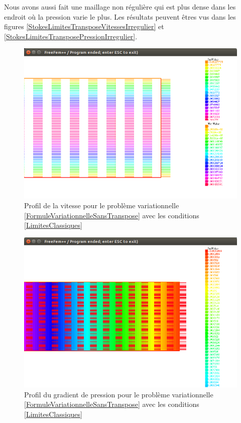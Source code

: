 \documentclass[11pt,a4paper]{article}
\numberwithin{equation}{subsection}
\numberwithin{figure}{subsection}
\begin{document}
Nous avons aussi fait une maillage non régulière qui est plus dense dans les endroit où la pression varie le plus. Les résultats peuvent êtres vus dans les figures \ref{StokesLimitesTransposeVitessesIrregulier} et \ref{StokesLimitesTransposePressionIrregulier}.

\begin{figure}[H]
\centering
\includegraphics[scale=0.4]{StokesConditionsClassiques.png}
\caption{Profil de la vitesse pour le problème variationnelle \ref{FormuleVariationnelleSansTranspose} avec les conditions \ref{LimitesClassiques}}
\label{StokesConditionsClassiques}
\end{figure}

\begin{figure}[H]
\centering
\includegraphics[scale=0.4]{StokesConditionsClassiquesPression.png}
\caption{Profil du gradient de pression pour le problème variationnelle \ref{FormuleVariationnelleSansTranspose} avec les conditions \ref{LimitesClassiques}}
\label{StokesCondtiionsClassiquesPression}
\end{figure}
\end{document}
